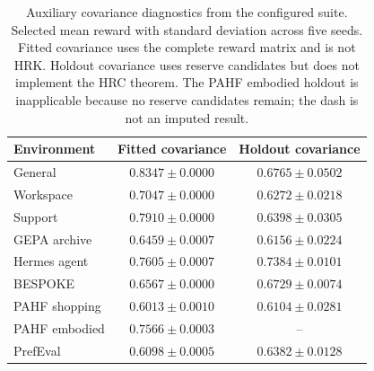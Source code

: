 \begin{table}[!htbp]
\centering
\small
\setlength{\tabcolsep}{4pt}
\caption{Auxiliary covariance diagnostics from the configured suite. Selected mean reward with standard deviation across five seeds. Fitted covariance uses the complete reward matrix and is not HRK. Holdout covariance uses reserve candidates but does not implement the HRC theorem. The PAHF embodied holdout is inapplicable because no reserve candidates remain; the dash is not an imputed result.}
\label{tab:hyper-aux-covariance}
\begin{tabular}{lcc}
\toprule
Environment & Fitted covariance & Holdout covariance \\
\midrule
General & $0.8347\pm0.0000$ & $0.6765\pm0.0502$ \\
Workspace & $0.7047\pm0.0000$ & $0.6272\pm0.0218$ \\
Support & $0.7910\pm0.0000$ & $0.6398\pm0.0305$ \\
GEPA archive & $0.6459\pm0.0007$ & $0.6156\pm0.0224$ \\
Hermes agent & $0.7605\pm0.0007$ & $0.7384\pm0.0101$ \\
BESPOKE & $0.6567\pm0.0000$ & $0.6729\pm0.0074$ \\
PAHF shopping & $0.6013\pm0.0010$ & $0.6104\pm0.0281$ \\
PAHF embodied & $0.7566\pm0.0003$ & -- \\
PrefEval & $0.6098\pm0.0005$ & $0.6382\pm0.0128$ \\
\bottomrule
\end{tabular}
\end{table}
